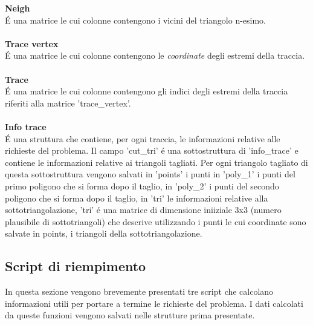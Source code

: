 \documentclass[11pt, a4paper]{article}
\begin{document}
\textbf{Neigh}\\
\'E una matrice le cui colonne contengono i vicini del triangolo n-esimo.\\\\
\textbf{Trace vertex}\\
\'E una matrice le cui colonne contengono le \textit{coordinate} degli estremi della traccia.\\\\
\textbf{Trace}\\
\'E una matrice le cui colonne contengono gli indici degli estremi della traccia riferiti alla matrice 'trace\_vertex'. \\\\
\textbf{Info trace}\\
\'E una struttura che contiene, per ogni traccia, le informazioni relative alle richieste del problema. Il campo 'cut\_tri' \'e una sottostruttura di 'info\_trace' e contiene le informazioni relative ai triangoli tagliati. Per ogni triangolo tagliato di questa sottostruttura vengono salvati in 'points' i punti in 'poly\_1' i punti del primo poligono che si forma dopo il taglio, in 'poly\_2' i punti del secondo poligono che si forma dopo il taglio, in 'tri' le informazioni relative alla sottotriangolazione, 'tri' \'e una matrice di dimensione iniiziale 3x3 (numero plausibile di sottotriangoli) che descrive utilizzando i punti le cui coordinate sono salvate in points, i triangoli della sottotriangolazione. \\
\subsection{\textbf{Script di riempimento}}
In questa sezione vengono brevemente presentati tre script che calcolano informazioni utili per portare a termine le richieste del problema. I dati calcolati da queste funzioni vengono salvati nelle strutture prima presentate.
\end{document}
